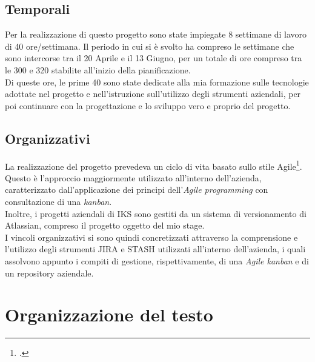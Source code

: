 \subsection{Temporali}
Per la realizzazione di questo progetto sono state impiegate 8 settimane di lavoro di 40 ore/settimana. Il periodo in cui si è svolto ha compreso le settimane che sono intercorse tra il 20 Aprile e il 13 Giugno, per un totale di ore compreso tra le 300 e 320 stabilite all'inizio della pianificazione.\\
Di queste ore, le prime 40 sono state dedicate alla mia formazione sulle tecnologie adottate nel progetto e nell'istruzione sull'utilizzo degli strumenti aziendali, per poi continuare con la progettazione e lo sviluppo vero e proprio del progetto.

\subsection{Organizzativi}
La realizzazione del progetto prevedeva un ciclo di vita basato sullo stile Agile\footcite{site:agile-manifesto}. Questo è l'approccio maggiormente utilizzato all'interno dell'azienda, caratterizzato dall'applicazione dei principi dell'\emph{Agile programming} con consultazione di una \emph{kanban}.\\
Inoltre, i progetti aziendali di IKS sono gestiti da un sistema di versionamento di Atlassian, compreso il progetto oggetto del mio stage.\\
I vincoli organizzativi si sono quindi concretizzati attraverso la comprensione e l'utilizzo degli strumenti JIRA e STASH utilizzati all'interno dell'azienda, i quali assolvono appunto i compiti di gestione, rispettivamente, di una \emph{Agile kanban} e di un repository aziendale.



\section{Organizzazione del testo}

%    
%    
%    
%    
%    

